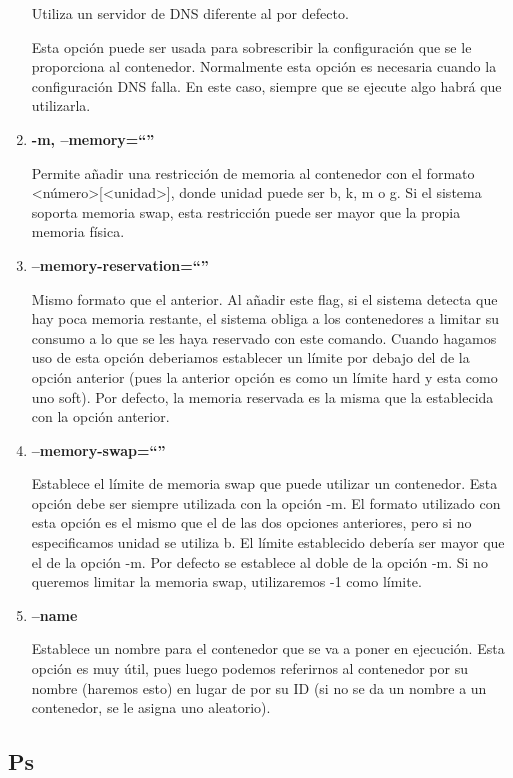 \documentclass[]{article}
\begin{document}
\begin{enumerate}
			Utiliza un servidor de DNS diferente al por defecto.
	
			Esta opción puede ser usada para sobrescribir la configuración que se le proporciona al contenedor.
			Normalmente esta opción es necesaria cuando la configuración DNS falla. En este caso, siempre que se ejecute algo habrá que utilizarla.
	
\item {\bf -m, --memory=``''}
	
			Permite añadir una restricción de memoria al contenedor con el formato <número>[<unidad>], donde unidad puede ser b, k, m o g.
			Si el sistema soporta memoria swap, esta restricción puede ser mayor que la propia memoria física.
	
\item {\bf --memory-reservation=``''}
	
			Mismo formato que el anterior.
			Al añadir este flag, si el sistema detecta que hay poca memoria restante, el sistema obliga a los contenedores a limitar su consumo a
			lo que se les haya reservado con este comando.
			Cuando hagamos uso de esta opción deberiamos establecer un límite por debajo del de la opción anterior (pues la anterior opción es como
			un límite hard y esta como uno soft). Por defecto, la memoria reservada es la misma que la establecida con la opción anterior.
	
\item {\bf --memory-swap=``''}
	
			Establece el límite de memoria swap que puede utilizar un contenedor. Esta opción debe ser siempre utilizada con la opción -m.
			El formato utilizado con esta opción es el mismo que el de las dos opciones anteriores, pero si no especificamos unidad se utiliza b.
			El límite establecido debería ser mayor que el de la opción -m.
			Por defecto se establece al doble de la opción -m.
			Si no queremos limitar la memoria swap, utilizaremos -1 como límite.
	
\item {\bf --name}
	
			Establece un nombre para el contenedor que se va a poner en ejecución. Esta opción es muy útil, pues luego podemos referirnos al contenedor por su nombre (haremos esto) en lugar de por su ID
			(si no se da un nombre a un contenedor, se le asigna uno aleatorio).

\end{enumerate}

\subsection{Ps}
\end{document}
